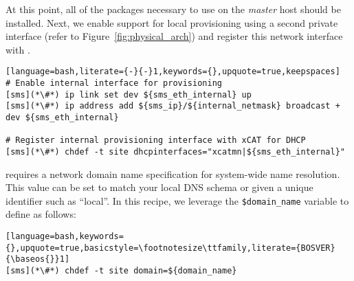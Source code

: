 At this point, all of the packages necessary to use \xCAT{} on the {\em master}
host should be installed. Next, we enable support for local provisioning using
a second private interface (refer to Figure~\ref{fig:physical_arch}) and
register this network interface with \xCAT{}.  

\begin{lstlisting}[language=bash,literate={-}{-}1,keywords={},upquote=true,keepspaces]
# Enable internal interface for provisioning
[sms](*\#*) ip link set dev ${sms_eth_internal} up
[sms](*\#*) ip address add ${sms_ip}/${internal_netmask} broadcast + dev ${sms_eth_internal}

# Register internal provisioning interface with xCAT for DHCP
[sms](*\#*) chdef -t site dhcpinterfaces="xcatmn|${sms_eth_internal}"

\end{lstlisting}


\noindent \xCAT{} requires a network domain name specification for system-wide name
resolution. This value can be set to match your local DNS schema or given a
unique identifier such as ``local''. In this recipe, we leverage the
\texttt{\$domain\_name} variable to define as follows:

\begin{lstlisting}[language=bash,keywords={},upquote=true,basicstyle=\footnotesize\ttfamily,literate={BOSVER}{\baseos{}}1]
[sms](*\#*) chdef -t site domain=${domain_name}
\end{lstlisting}
